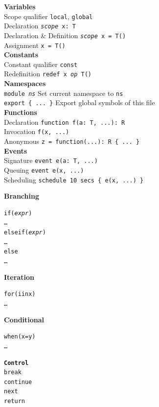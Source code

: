 \documentclass[10pt,landscape]{article}
\newcommand{\minisec}[1]{\textbf{#1}\\}
\begin{document}
\begin{multicols*}{3}
\minisec{Variables}
Scope qualifier \dotfill \texttt{local}, \texttt{global}\\ 
Declaration \dotfill \texttt{\textit{scope} x:~T}\\
Declaration \& Definition \dotfill \texttt{\textit{scope} x = T()}\\
Assignment \dotfill \texttt{x = T()}\\

\minisec{Constants}
Constant qualifier \dotfill \texttt{const} \\
Redefinition \dotfill \texttt{redef x \textit{op} T()}\\

\minisec{Namespaces}
\texttt{module \textit{ns}} \dotfill Set current namespace to \texttt{ns}\\
\verb|export { ... }| \dotfill Export global symbols of this file \\

\minisec{Functions}
Declaration \dotfill \verb|function f(a: T, ...): R|\\
Invocation \dotfill \verb|f(x, ...)|\\
Anonymous \dotfill \texttt{z = function(...):~R~\{ ... \}}\\

\minisec{Events}
Signature \dotfill \verb|event e(a: T, ...)|\\
Queuing \dotfill \verb|event e(x, ...)|\\
Scheduling \dotfill \verb|schedule 10 secs { e(x, ...) }|\\

\vspace{-10pt}
\begin{multicols*}{3}
\textbf{Branching}
\begin{alltt}
if (\textit{expr})
    \dots
else if (\textit{expr})
    \dots
else
    \dots
\end{alltt}

\textbf{Iteration}
\begin{alltt}
for (i in x)
    \dots
\end{alltt}

\textbf{Conditional}
\begin{alltt}
when (x = y)
    \dots
\end{alltt}
\vspace{-10pt}

\begin{alltt}
\textrm{\textbf{Control}}\vspace{5pt}
break
continue
next
return
\end{alltt}
\end{multicols*}


\end{multicols*}
\end{document}
